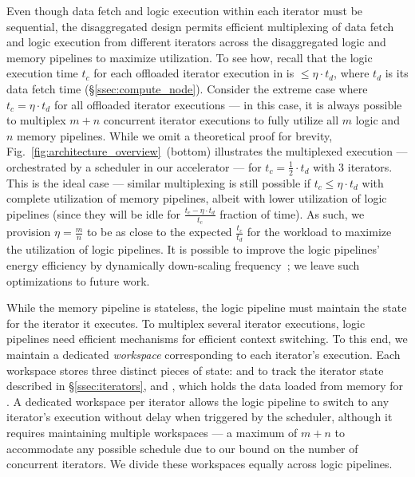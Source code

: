 Even though data fetch and logic execution within each iterator must be sequential, the disaggregated design permits efficient multiplexing of data fetch and logic execution from different iterators across the disaggregated logic and memory pipelines to maximize utilization. To see how, recall that the logic execution time $t_c$ for each offloaded iterator execution in \pulse is $\leq\eta\cdot t_d$, where $t_d$ is its data fetch time (\S\ref{ssec:compute_node}). Consider the extreme case where $t_c=\eta \cdot t_d$ for all offloaded iterator executions --- in this case, it is always possible to multiplex $m+n$ concurrent iterator executions to fully utilize all $m$ logic and $n$ memory pipelines. While we omit a theoretical proof for brevity, Fig.~\ref{fig:architecture_overview}~(bottom) illustrates the multiplexed execution --- orchestrated by a scheduler in our accelerator --- for $t_c=\frac{1}{2}\cdot t_d$ with $3$ iterators. This is the ideal case --- similar multiplexing is still possible if $t_c\leq\eta\cdot t_d$ with complete utilization of memory pipelines, albeit with lower utilization of logic pipelines (since they will be idle for $\frac{t_c - \eta\cdot t_d}{t_c}$ fraction of time). As such, we provision $\eta=\frac{m}{n}$ to be as close to the expected $\frac{t_c}{t_d}$ for the workload to maximize the utilization of logic pipelines. It is possible to improve the logic pipelines' energy efficiency by dynamically down-scaling frequency~\cite{daepowerscaling}; we leave such optimizations to future work.

While the memory pipeline is stateless, the logic pipeline must maintain the state for the iterator it executes. To multiplex several iterator executions, logic pipelines need efficient mechanisms for efficient context switching. To this end, we maintain a dedicated \emph{workspace} corresponding to each iterator's execution. Each workspace stores three distinct pieces of state:  and  to track the iterator state described in \S\ref{ssec:iterators}, and , which holds the data loaded from memory for . A dedicated workspace per iterator allows the logic pipeline to switch to any iterator's execution without delay when triggered by the scheduler, although it requires maintaining multiple workspaces --- a maximum of $m+n$ to accommodate any possible schedule due to our bound on the number of concurrent iterators. We divide these workspaces equally across logic pipelines.


